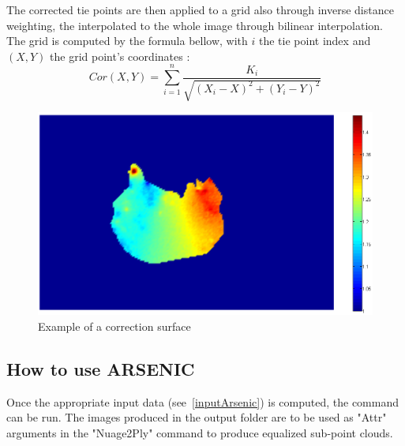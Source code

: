 The corrected tie points are then applied to a grid also through inverse distance weighting, the interpolated to the whole image through bilinear interpolation. The grid is computed by the formula bellow, with $i$ the tie point index and $(X,Y)$ the grid point's coordinates : \[Cor(X,Y)=\sum_{i=1}^{n} \frac{K_{i}}{\sqrt{(X_{i}-X)^2+(Y_{i}-Y)^2}}\]

\begin{figure}[H]
\centering
\includegraphics[width=15cm]{FIGS/Arsenic/SurfCorr.png}
\caption{Example of a correction surface}
\label{SurfCorr}
\end{figure}


\subsection{How to use ARSENIC}

Once the appropriate input data (see~\ref{inputArsenic}) is computed, the command can be run. The images produced in the output folder are to be used as "Attr" arguments in the "Nuage2Ply" command to produce equalized sub-point clouds.



